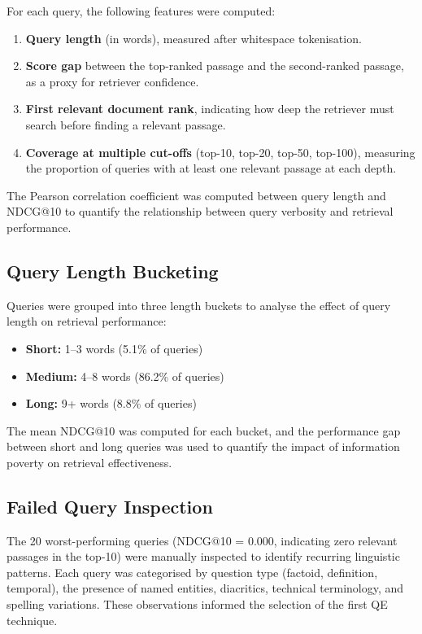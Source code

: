 For each query, the following features were computed:

\begin{enumerate}
    \item \textbf{Query length} (in words), measured after whitespace tokenisation.
    \item \textbf{Score gap} between the top-ranked passage and the second-ranked passage, as a proxy for retriever confidence.
    \item \textbf{First relevant document rank}, indicating how deep the retriever must search before finding a relevant passage.
    \item \textbf{Coverage at multiple cut-offs} (top-10, top-20, top-50, top-100), measuring the proportion of queries with at least one relevant passage at each depth.
\end{enumerate}

The Pearson correlation coefficient was computed between query length and NDCG@10 to quantify the relationship between query verbosity and retrieval performance.

\subsection{Query Length Bucketing}
\label{sec:meth_error_buckets}

Queries were grouped into three length buckets to analyse the effect of query length on retrieval performance:

\begin{itemize}
    \item \textbf{Short:} 1--3 words (5.1\% of queries)
    \item \textbf{Medium:} 4--8 words (86.2\% of queries)
    \item \textbf{Long:} 9+ words (8.8\% of queries)
\end{itemize}

The mean NDCG@10 was computed for each bucket, and the performance gap between short and long queries was used to quantify the impact of information poverty on retrieval effectiveness.

\subsection{Failed Query Inspection}
\label{sec:meth_error_inspection}

The 20 worst-performing queries (NDCG@10 = 0.000, indicating zero relevant passages in the top-10) were manually inspected to identify recurring linguistic patterns. Each query was categorised by question type (factoid, definition, temporal), the presence of named entities, diacritics, technical terminology, and spelling variations. These observations informed the selection of the first QE technique.

